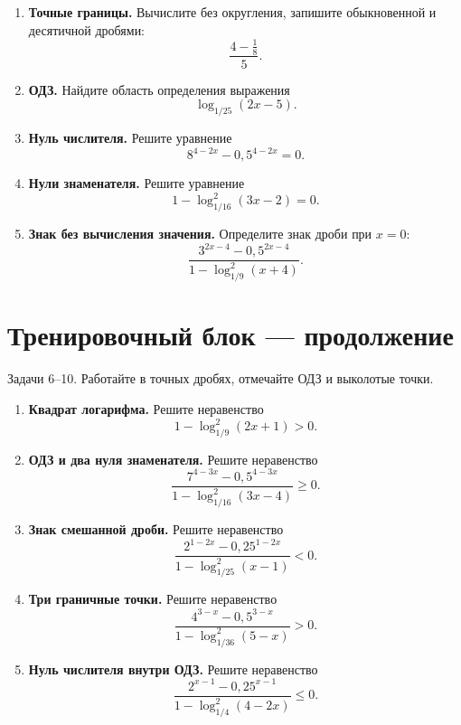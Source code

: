 \documentclass[a4paper,12pt]{article}
\begin{document}
\begin{enumerate}[itemsep=17pt]
\item \textbf{Точные границы.} Вычислите без округления, запишите обыкновенной и десятичной дробями:
\[
\frac{4-\frac18}{5}.
\]

\item \textbf{ОДЗ.} Найдите область определения выражения
\[
\log_{1/25}(2x-5).
\]

\item \textbf{Нуль числителя.} Решите уравнение
\[
8^{4-2x}-0{,}5^{4-2x}=0.
\]

\item \textbf{Нули знаменателя.} Решите уравнение
\[
1-\log_{1/16}^{2}(3x-2)=0.
\]

\item \textbf{Знак без вычисления значения.} Определите знак дроби при $x=0$:
\[
\frac{3^{2x-4}-0{,}5^{2x-4}}{1-\log_{1/9}^{2}(x+4)}.
\]

\end{enumerate}
\clearpage
\section*{Тренировочный блок --- продолжение}
\textcolor{quiet}{Задачи 6--10. Работайте в точных дробях, отмечайте ОДЗ и выколотые точки.}\par
\begin{enumerate}[start=6,itemsep=26pt]
\item \textbf{Квадрат логарифма.} Решите неравенство
\[
1-\log_{1/9}^{2}(2x+1)>0.
\]

\item \textbf{ОДЗ и два нуля знаменателя.} Решите неравенство
\[
\frac{7^{4-3x}-0{,}5^{4-3x}}
{1-\log_{1/16}^{2}(3x-4)}\ge0.
\]

\item \textbf{Знак смешанной дроби.} Решите неравенство
\[
\frac{2^{1-2x}-0{,}25^{1-2x}}
{1-\log_{1/25}^{2}(x-1)}<0.
\]

\item \textbf{Три граничные точки.} Решите неравенство
\[
\frac{4^{3-x}-0{,}5^{3-x}}
{1-\log_{1/36}^{2}(5-x)}>0.
\]

\item \textbf{Нуль числителя внутри ОДЗ.} Решите неравенство
\[
\frac{2^{x-1}-0{,}25^{x-1}}
{1-\log_{1/4}^{2}(4-2x)}\le0.
\]
\end{enumerate}

\clearpage
\end{document}

